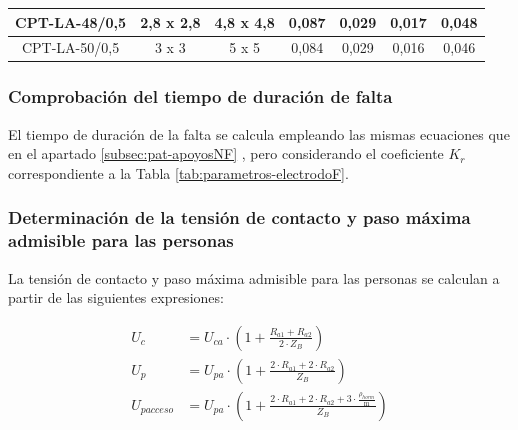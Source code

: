 \begin{table}[H]
\begin{tabular}{|c|c|c|c|c|c|c|}
CPT-LA-48/0,5                                                                 & 2,8 x 2,8                                                                                          & 4,8 x 4,8                                                                            & 0,087                                                                      & 0,029                                                                           & 0,017                                                                             & 0,048                                                                             \\ \hline
CPT-LA-50/0,5                                                                 & 3 x 3                                                                                              & 5 x 5                                                                                & 0,084                                                                      & 0,029                                                                           & 0,016                                                                             & 0,046                                                                             \\ \hline
\end{tabular}
\end{table}

\subsubsection{Comprobación del tiempo de duración de falta}
\label{subsubsec:apoyosF-tiempo-pat}
El tiempo de duración de la falta se calcula empleando las mismas ecuaciones que en el apartado \ref{subsec:pat-apoyosNF} , pero considerando el coeficiente $K_r$ correspondiente a la Tabla \ref{tab:parametros-electrodoF}.

\subsubsection{Determinación de la tensión de contacto y paso máxima admisible para las personas}
\label{subsubsec:apoyosF-tensionesMaximasAdm-pat}
La tensión de contacto y paso máxima admisible para las personas se calculan a partir de las siguientes expresiones:

\begin{align}
    U_c &= U_{ca}\cdot (1+\frac{R_{a1}+R_{a2}}{2\cdot Z_B})
    \label{eq:pat-Uc}\\[0.5em]
    U_p &= U_{pa}\cdot(1+\frac{2\cdot R_{a1}+2\cdot R_{a2}}{Z_B})
    \label{eq:pat-Up}\\[0.5em]
    U_{pacceso} &= U_{pa} \cdot (1+\frac{2\cdot R_{a1}+2\cdot R_{a2}+3\cdot\frac{\rho_{horm}}{\si{\meter}}}{Z_B})
    \label{eq:pat-Upacceso}
\end{align}

